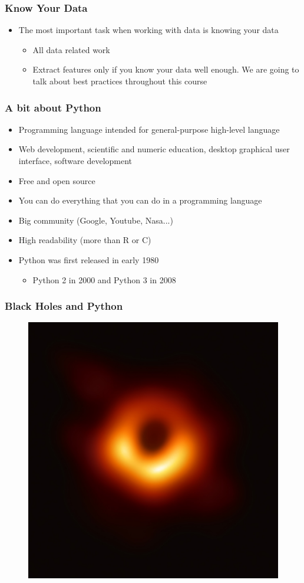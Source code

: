 \documentclass[compress, aspectratio=54]{beamer}
\begin{document}
\begin{frame}
\frametitle{Know Your Data}
\begin{itemize}
\item The most important task when working with data is knowing your data
\begin{itemize}
\item All data related work 
\item Extract features only if you know your data well enough. We are going to talk about best practices throughout this course
\end{itemize}
\end{itemize}
\end{frame}


\begin{frame}
\frametitle{A bit about Python}
\begin{itemize}

\item Programming language intended for general-purpose high-level language
\item Web development, scientific and numeric education, desktop graphical user interface, software development
\item Free and open source 
\item You can do everything that you can do in a programming language
\item Big community (Google, Youtube, Nasa...)
\item High readability (more than R or C)
\item Python was first released in early 1980
\begin{itemize}

\item Python 2 in 2000 and Python 3 in 2008
\end{itemize}
\end{itemize}
\end{frame}

\begin{frame}
\frametitle{Black Holes and Python}
\begin{figure}
\includegraphics[width=0.5\linewidth ]{Figures/black_hole.png}
\end{figure}
\end{frame}
\end{document}
